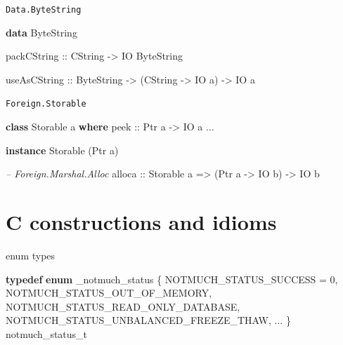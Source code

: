 \documentclass[ignorenonframetext,aspectratio=169]{beamer}
\newenvironment{Shaded}{}{}
\newcommand{\KeywordTok}[1]{\textcolor[rgb]{0.00,0.44,0.13}{\textbf{{#1}}}}
\newcommand{\DataTypeTok}[1]{\textcolor[rgb]{0.56,0.13,0.00}{{#1}}}
\newcommand{\DecValTok}[1]{\textcolor[rgb]{0.25,0.63,0.44}{{#1}}}
\newcommand{\CommentTok}[1]{\textcolor[rgb]{0.38,0.63,0.69}{\textit{{#1}}}}
\newcommand{\OtherTok}[1]{\textcolor[rgb]{0.00,0.44,0.13}{{#1}}}
\newcommand{\NormalTok}[1]{{#1}}
\begin{document}
\begin{frame}[fragile]{\texttt{Data.ByteString}}

\begin{Shaded}
\begin{Highlighting}[]
\KeywordTok{data} \DataTypeTok{ByteString}

\OtherTok{packCString ::} \DataTypeTok{CString} \OtherTok{->} \DataTypeTok{IO} \DataTypeTok{ByteString}

\OtherTok{useAsCString ::} \DataTypeTok{ByteString} \OtherTok{->} \NormalTok{(}\DataTypeTok{CString} \OtherTok{->} \DataTypeTok{IO} \NormalTok{a) }\OtherTok{->} \DataTypeTok{IO} \NormalTok{a}
\end{Highlighting}
\end{Shaded}

\end{frame}

\begin{frame}[fragile]{\texttt{Foreign.Storable}}

\begin{Shaded}
\begin{Highlighting}[]
\KeywordTok{class} \DataTypeTok{Storable} \NormalTok{a }\KeywordTok{where}
\OtherTok{  peek ::} \DataTypeTok{Ptr} \NormalTok{a }\OtherTok{->} \DataTypeTok{IO} \NormalTok{a}
  \OtherTok{...}

\KeywordTok{instance} \DataTypeTok{Storable} \NormalTok{(}\DataTypeTok{Ptr} \NormalTok{a)}


\CommentTok{-- Foreign.Marshal.Alloc}
\OtherTok{alloca ::} \DataTypeTok{Storable} \NormalTok{a }\OtherTok{=>} \NormalTok{(}\DataTypeTok{Ptr} \NormalTok{a }\OtherTok{->} \DataTypeTok{IO} \NormalTok{b) }\OtherTok{->} \DataTypeTok{IO} \NormalTok{b}
\end{Highlighting}
\end{Shaded}

\end{frame}

\section{C constructions and idioms}\label{c-constructions-and-idioms}

\begin{frame}[fragile]{enum types}

\begin{Shaded}
\begin{Highlighting}[]
\KeywordTok{typedef} \KeywordTok{enum} \NormalTok{_notmuch_status \{}
  \NormalTok{NOTMUCH_STATUS_SUCCESS = }\DecValTok{0}\NormalTok{,}
  \NormalTok{NOTMUCH_STATUS_OUT_OF_MEMORY,}
  \NormalTok{NOTMUCH_STATUS_READ_ONLY_DATABASE,}
  \NormalTok{NOTMUCH_STATUS_UNBALANCED_FREEZE_THAW,}
  \NormalTok{...}
\NormalTok{\} notmuch_status_t}
\end{Highlighting}
\end{Shaded}

\end{frame}
\end{document}
